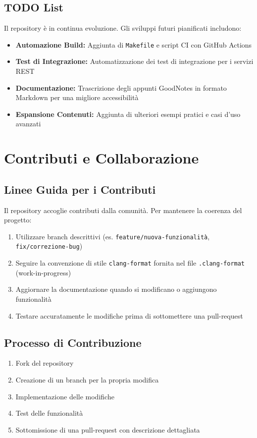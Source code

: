 \documentclass[12pt,a4paper]{article}
\begin{document}
\subsection{TODO List}
Il repository è in continua evoluzione. Gli sviluppi futuri pianificati includono:

\begin{itemize}
    \item \textbf{Automazione Build:} Aggiunta di \texttt{Makefile} e script CI con GitHub Actions
    \item \textbf{Test di Integrazione:} Automatizzazione dei test di integrazione per i servizi REST
    \item \textbf{Documentazione:} Trascrizione degli appunti GoodNotes in formato Markdown per una migliore accessibilità
    \item \textbf{Espansione Contenuti:} Aggiunta di ulteriori esempi pratici e casi d'uso avanzati
\end{itemize}

\section{Contributi e Collaborazione}

\subsection{Linee Guida per i Contributi}
Il repository accoglie contributi dalla comunità. Per mantenere la coerenza del progetto:

\begin{enumerate}
    \item Utilizzare branch descrittivi (es. \texttt{feature/nuova-funzionalità}, \texttt{fix/correzione-bug})
    \item Seguire la convenzione di stile \texttt{clang-format} fornita nel file \texttt{.clang-format} (work-in-progress)
    \item Aggiornare la documentazione quando si modificano o aggiungono funzionalità
    \item Testare accuratamente le modifiche prima di sottomettere una pull-request
\end{enumerate}

\subsection{Processo di Contribuzione}
\begin{enumerate}
    \item Fork del repository
    \item Creazione di un branch per la propria modifica
    \item Implementazione delle modifiche
    \item Test delle funzionalità
    \item Sottomissione di una pull-request con descrizione dettagliata
\end{enumerate}
\end{document}
